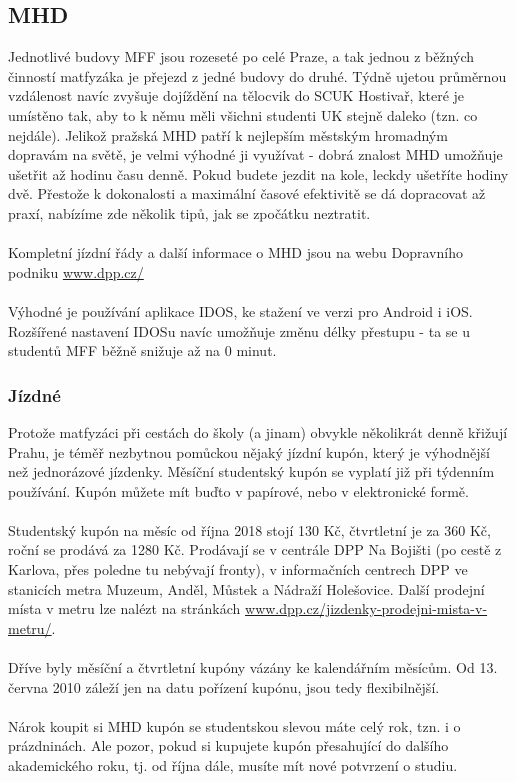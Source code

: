 \subsection{MHD}
Jednotlivé budovy MFF jsou rozeseté po celé Praze, a tak jednou z běžných
činností matfyzáka je přejezd z jedné budovy do druhé. Týdně ujetou průměrnou
vzdálenost navíc zvyšuje dojíždění na tělocvik do SCUK Hostivař, které je
umístěno tak, aby to k němu měli všichni studenti UK stejně daleko (tzn. co
nejdále). Jelikož pražská MHD patří k nejlepším městským hromadným dopravám na
světě, je velmi výhodné ji využívat - dobrá znalost MHD umožňuje ušetřit až
hodinu času denně. Pokud budete jezdit na kole, leckdy ušetříte hodiny dvě.
Přestože k dokonalosti a maximální časové efektivitě se dá dopracovat až praxí,
nabízíme zde několik tipů, jak se zpočátku neztratit.
\\\\
Kompletní jízdní řády a další informace o MHD jsou na webu Dopravního podniku
\url{www.dpp.cz/}
\\\\
Výhodné je používání aplikace IDOS, ke stažení ve verzi pro Android i iOS.
Rozšířené nastavení IDOSu navíc umožňuje změnu délky přestupu - ta se u studentů
MFF běžně snižuje až na 0 minut.


\subsubsection{Jízdné}
Protože matfyzáci při cestách do školy (a jinam) obvykle několikrát denně
křižují Prahu, je téměř nezbytnou pomůckou nějaký jízdní kupón, který je
výhodnější než jednorázové jízdenky. Měsíční studentský kupón se vyplatí již při
týdenním používání. Kupón můžete mít buďto v papírové, nebo v elektronické
formě.
\\\\
Studentský kupón na měsíc od října 2018 stojí 130 Kč, čtvrtletní je za 360 Kč,
roční se prodává za 1280 Kč. Prodávají se v centrále DPP Na Bojišti (po cestě z
Karlova, přes poledne tu nebývají fronty), v informačních centrech DPP ve
stanicích metra Muzeum, Anděl, Můstek a Nádraží Holešovice. Další prodejní místa
v metru lze nalézt na stránkách
\url{www.dpp.cz/jizdenky-prodejni-mista-v-metru/}.
\\\\
Dříve byly měsíční a čtvrtletní kupóny vázány ke kalendářním měsícům. Od 13.
června 2010 záleží jen na datu pořízení kupónu, jsou tedy flexibilnější.
\\\\
Nárok koupit si MHD kupón se studentskou slevou máte celý rok, tzn. i o
prázdninách. Ale pozor, pokud si kupujete kupón přesahující do dalšího
akademického roku, tj. od října dále, musíte mít nové potvrzení o studiu.


